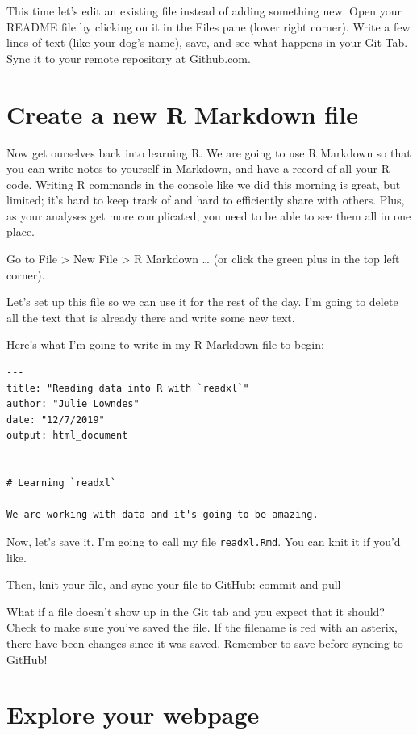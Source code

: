 \documentclass[]{book}
\begin{document}
This time let's edit an existing file instead of adding something new. Open your README file by clicking on it in the Files pane (lower right corner). Write a few lines of text (like your dog's name), save, and see what happens in your Git Tab. Sync it to your remote repository at Github.com.

\hypertarget{create-a-new-r-markdown-file}{%
\section{Create a new R Markdown file}\label{create-a-new-r-markdown-file}}

Now get ourselves back into learning R. We are going to use R Markdown so that you can write notes to yourself in Markdown, and have a record of all your R code. Writing R commands in the console like we did this morning is great, but limited; it's hard to keep track of and hard to efficiently share with others. Plus, as your analyses get more complicated, you need to be able to see them all in one place.

Go to File \textgreater{} New File \textgreater{} R Markdown \ldots{} (or click the green plus in the top left corner).

Let's set up this file so we can use it for the rest of the day. I'm going to delete all the text that is already there and write some new text.

Here's what I'm going to write in my R Markdown file to begin:

\begin{verbatim}
---
title: "Reading data into R with `readxl`"
author: "Julie Lowndes"
date: "12/7/2019"
output: html_document
---

# Learning `readxl`

We are working with data and it's going to be amazing.
\end{verbatim}

Now, let's save it. I'm going to call my file \texttt{readxl.Rmd}. You can knit it if you'd like.

Then, knit your file, and sync your file to GitHub: commit and pull

What if a file doesn't show up in the Git tab and you expect that it should? Check to make sure you've saved the file. If the filename is red with an asterix, there have been changes since it was saved. Remember to save before syncing to GitHub!

\hypertarget{explore-your-webpage}{%
\section{Explore your webpage}\label{explore-your-webpage}}
\end{document}
